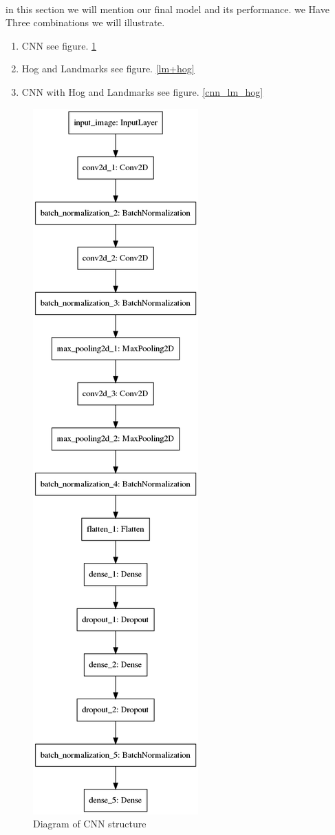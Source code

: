 \paragraph{}
in this section we will mention our final model and its performance.
we Have Three combinations we will illustrate.

\begin{enumerate}
	\item CNN see figure. \ref{cnn}
	\item Hog and Landmarks see figure. \ref{lm+hog}
	\item CNN with Hog and Landmarks see figure. \ref{cnn_lm_hog}
\end{enumerate}

\begin{figure}
	\centering
	\label{cnn}
	\includegraphics[width=.3\textwidth]{images/cnn.png}
	\caption{Diagram of CNN structure}
\end{figure}

